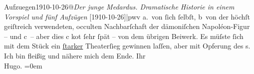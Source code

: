 \begin{ledgroupsized}[t]{13cm}
{                  Aufzuegen1910-10-26@\strich\emph{Der junge Medardus. Dramatische Historie in einem Vorspiel und fünf Aufzügen} {[}1910-10-26{]}|pwv} a. von ſich ſelbſt,
               b von der höchſt geiſtreich verwendeten, occulten Nachbarſchaft der dämoniſchen Napoléon-Figur – und c – aber
               dies c ko{\geminationm}t ſehr ſpät – von dem übrigen Beiwerk.\pend
           \pstart
           Es müſste ſich mit dem Stück ein \uline{ſtarker} Theaterſieg
               gewinnen laſſen, aber mit Opferung des \label{K_L01885-2v}\label{K_L01885-2h}s.\pend
           \pstart
           Ich bin fleißig und nähere
               mich dem Ende.\pend
           \pstart
           Ihr{\\[\baselineskip]}\spacefill\mbox{Hugo.}\pend
           \leftskip=0em{}
         
         \endnumbering{}\end{ledgroupsized}  \newcommand{\dateiname}{L01885}\newcommand{\titel}{Hugo von Hofmannsthal an Arthur Schnitzler, 7. 11. 1909}\newcommand{\editorInnen}{Martin Anton Müller und Gerd-Hermann Susen}
      